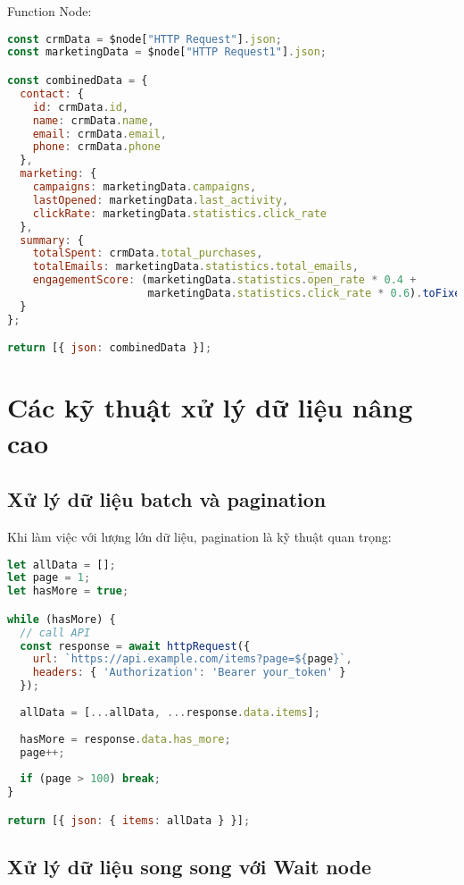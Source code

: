 Function Node:
\begin{lstlisting}[language=JavaScript]
const crmData = $node["HTTP Request"].json;
const marketingData = $node["HTTP Request1"].json;

const combinedData = {
  contact: {
    id: crmData.id,
    name: crmData.name,
    email: crmData.email,
    phone: crmData.phone
  },
  marketing: {
    campaigns: marketingData.campaigns,
    lastOpened: marketingData.last_activity,
    clickRate: marketingData.statistics.click_rate
  },
  summary: {
    totalSpent: crmData.total_purchases,
    totalEmails: marketingData.statistics.total_emails,
    engagementScore: (marketingData.statistics.open_rate * 0.4 + 
                      marketingData.statistics.click_rate * 0.6).toFixed(2)
  }
};

return [{ json: combinedData }];
\end{lstlisting}

\section{Các kỹ thuật xử lý dữ liệu nâng cao}

\subsection{Xử lý dữ liệu batch và pagination}

Khi làm việc với lượng lớn dữ liệu, pagination là kỹ thuật quan trọng:

\begin{lstlisting}[language=JavaScript]
let allData = [];
let page = 1;
let hasMore = true;

while (hasMore) {
  // call API 
  const response = await httpRequest({
    url: `https://api.example.com/items?page=${page}`,
    headers: { 'Authorization': 'Bearer your_token' }
  });
  
  allData = [...allData, ...response.data.items];
  
  hasMore = response.data.has_more;
  page++;
  
  if (page > 100) break;
}

return [{ json: { items: allData } }];
\end{lstlisting}

\subsection{Xử lý dữ liệu song song với Wait node}

